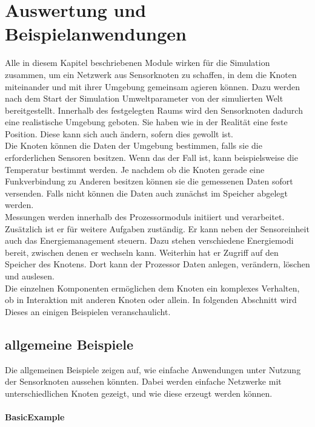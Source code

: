 \section{Auswertung und Beispielanwendungen}

Alle in diesem Kapitel beschriebenen Module wirken für die Simulation zusammen, um ein Netzwerk aus Sensorknoten zu schaffen, in dem die Knoten miteinander und mit ihrer Umgebung gemeinsam agieren können. Dazu werden nach dem Start der Simulation Umweltparameter von der simulierten Welt bereitgestellt. Innerhalb des festgelegten Raums wird den Sensorknoten dadurch eine realistische Umgebung geboten. Sie haben wie in der Realität eine feste Position. Diese kann sich auch ändern, sofern dies gewollt ist. \\
Die Knoten können die Daten der Umgebung bestimmen, falls sie die erforderlichen Sensoren besitzen. Wenn das der Fall ist, kann beispielsweise die Temperatur bestimmt werden. Je nachdem ob die Knoten gerade eine Funkverbindung zu Anderen besitzen können sie die gemessenen Daten sofort versenden. Falls nicht können die Daten auch zunächst im Speicher abgelegt werden.\\
Messungen werden innerhalb des Prozessormoduls initiiert und verarbeitet. Zusätzlich ist er für weitere Aufgaben zuständig. Er kann neben der Sensoreinheit auch das Energiemanagement steuern. Dazu stehen verschiedene Energiemodi bereit, zwischen denen er wechseln kann. Weiterhin hat er Zugriff auf den Speicher des Knotens. Dort kann der Prozessor Daten anlegen, verändern, löschen und auslesen. \\
Die einzelnen Komponenten ermöglichen dem Knoten ein komplexes Verhalten, ob in Interaktion mit anderen Knoten oder allein. In folgenden Abschnitt wird Dieses an einigen Beispielen veranschaulicht.

\subsection*{allgemeine Beispiele}

Die allgemeinen Beispiele zeigen auf, wie einfache Anwendungen unter Nutzung der Sensorknoten aussehen könnten. Dabei werden einfache Netzwerke mit unterschiedlichen Knoten gezeigt, und wie diese erzeugt werden können.

\paragraph{BasicExample}


